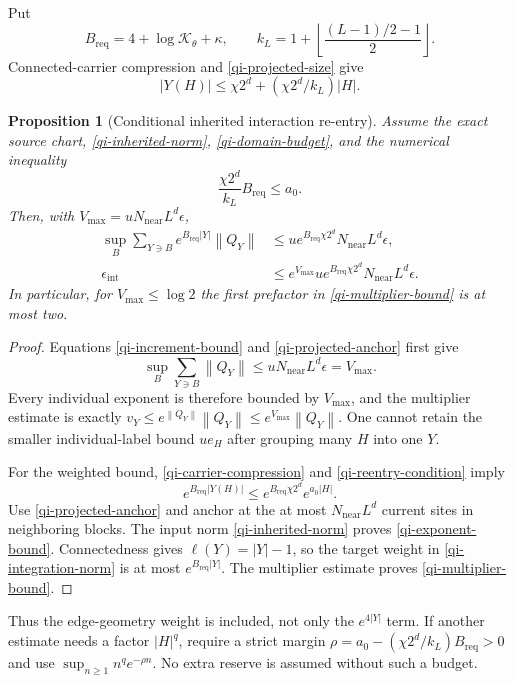 \documentclass[11pt]{article}
\newtheorem{proposition}[theorem]{Proposition}
\theoremstyle{remark}
\newcommand{\norm}[1]{\left\|#1\right\|}
\begin{document}
Put
\begin{equation}\label{qi-required-weight}
 B_{\mathrm{req}}=4+\log\mathcal K_\theta+\kappa,
 \qquad
 k_L=1+\left\lfloor\frac{(L-1)/2-1}{2}\right\rfloor.
\end{equation}
Connected-carrier compression and \eqref{qi-projected-size} give
\begin{equation}\label{qi-carrier-compression}
 |Y(H)|\le\chi2^d+(\chi2^d/k_L)|H|.
\end{equation}

\begin{proposition}[Conditional inherited interaction re-entry]
\label{qi-reentry-proposition}
Assume the exact source chart, \eqref{qi-inherited-norm},
\eqref{qi-domain-budget}, and the numerical inequality
\begin{equation}\label{qi-reentry-condition}
 \frac{\chi2^d}{k_L}B_{\mathrm{req}}\le a_0.
\end{equation}
Then, with
$V_{\max}=u N_{\mathrm{near}}L^d\epsilon$,
\begin{align}
 \sup_B\sum_{Y\ni B}e^{B_{\mathrm{req}}|Y|}\norm{Q_Y}
 &\le u e^{B_{\mathrm{req}}\chi2^d}
                       N_{\mathrm{near}}L^d\epsilon,              \label{qi-exponent-bound}\\
 \epsilon_{\mathrm{int}}
 &\le e^{V_{\max}}u e^{B_{\mathrm{req}}\chi2^d}
                       N_{\mathrm{near}}L^d\epsilon.              \label{qi-multiplier-bound}
\end{align}
In particular, for $V_{\max}\le\log2$ the first prefactor
in \eqref{qi-multiplier-bound} is at most two.
\end{proposition}
\begin{proof}
Equations \eqref{qi-increment-bound} and
\eqref{qi-projected-anchor} first give
\[
 \sup_B\sum_{Y\ni B}\norm{Q_Y}
       \le u N_{\mathrm{near}}L^d\epsilon=V_{\max}.
\]
Every individual exponent is therefore bounded by $V_{\max}$,
and the multiplier estimate is exactly
$v_Y\le e^{\norm{Q_Y}}\norm{Q_Y}\le e^{V_{\max}}\norm{Q_Y}$.
One cannot retain the smaller individual-label bound $u e_H$
after grouping many $H$ into one $Y$.

For the weighted bound, \eqref{qi-carrier-compression} and
\eqref{qi-reentry-condition} imply
\[
 e^{B_{\mathrm{req}}|Y(H)|}
       \le e^{B_{\mathrm{req}}\chi2^d}e^{a_0|H|}.
\]
Use \eqref{qi-projected-anchor} and anchor at the at most
$N_{\mathrm{near}}L^d$ current sites in neighboring blocks.
The input norm \eqref{qi-inherited-norm} proves
\eqref{qi-exponent-bound}. Connectedness gives
$\ell(Y)=|Y|-1$, so the target weight in
\eqref{qi-integration-norm} is at most
$e^{B_{\mathrm{req}}|Y|}$. The multiplier estimate proves
\eqref{qi-multiplier-bound}.
\end{proof}
Thus the edge-geometry weight is included, not only the
$e^{4|Y|}$ term. If another estimate needs a factor $|H|^q$,
require a strict margin
$\rho=a_0-(\chi2^d/k_L)B_{\mathrm{req}}>0$ and use
$\sup_{n\ge1}n^q e^{-\rho n}$. No extra reserve is assumed
without such a budget.
\end{document}

